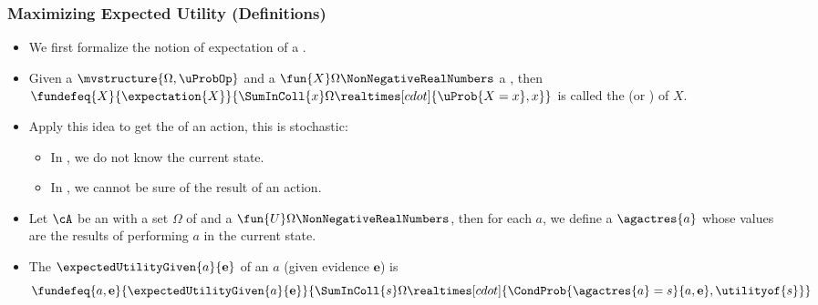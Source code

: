 \documentclass[notes,mh]{mikoslides}
\begin{document}
\begin{module}[id=MEU-principle]
\begin{frame}
  \frametitle{Maximizing Expected Utility (Definitions)}
  \begin{itemize}
  \item We first formalize the notion of expectation of a
    .
  \item
    \begin{definition}
      Given a  $\mvstructure{\Omega,\uProbOp}$ and a
      $\fun{X}\Omega\NonNegativeRealNumbers$ a
      , then
      $\fundefeq{X}{\expectation{X}}{\SumInColl{x}\Omega{\realtimes[cdot]{\uProb{X=x},x}}}$
      is called the  (or
      ) of $X$.
    \end{definition}
  \item
    \begin{omtext}[title=Idea]
      Apply this idea to get the  of an action,
      this is stochastic:
      \begin{itemize}
      \item In  , we
        do not know the current state.
      \item In 
        , we cannot be sure of the result of an action.
      \end{itemize}
    \end{omtext}
  \item
    \begin{definition}
      Let $\cA$ be an  with a set $\Omega$ of
       and a 
      $\fun{U}\Omega\NonNegativeRealNumbers$, then for each 
      $a$, we define a  $\agactres{a}$ whose
      values are the results of performing $a$ in the current state.
    \end{definition}
  \item
    \begin{definition}
      The  $\expectedUtilityGiven{a}{\mathbf{e}}$ of an
       $a$ (given evidence $\mathbf{e}$) is
      \[\fundefeq{a,\mathbf{e}}{\expectedUtilityGiven{a}{\mathbf{e}}}
        {\SumInColl{s}\Omega
          {\realtimes[cdot]{\CondProb{\agactres{a}=s}{a,\mathbf{e}},\utilityof{s}}}}
      \]
    \end{definition}
  \end{itemize}
\end{frame}
\end{module}
\end{document}
